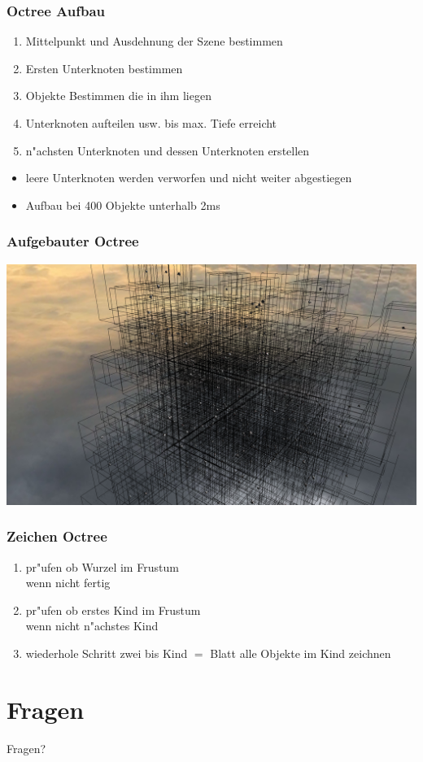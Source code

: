 \documentclass[notes]{beamer} %
\begin{document}
\begin{frame}
\begin{spacing}{1}
\frametitle{Octree Aufbau}
\begin{enumerate}
\item Mittelpunkt und Ausdehnung der Szene bestimmen
\item Ersten Unterknoten bestimmen 
\item Objekte Bestimmen die in ihm liegen
\item Unterknoten aufteilen usw. bis max. Tiefe erreicht
\item n"achsten Unterknoten und dessen Unterknoten erstellen
\end{enumerate}

\begin{itemize}
\item leere Unterknoten werden verworfen und nicht weiter abgestiegen
\item Aufbau bei 400 Objekte unterhalb 2ms
\end{itemize}
\end{spacing}
\end{frame}

\begin{frame}
\begin{spacing}{1}
\frametitle{Aufgebauter Octree}
\includegraphics[width = 1.0\textwidth]{oc2.png}
\end{spacing}
\end{frame}

\begin{frame}
\begin{spacing}{1}
\frametitle{Zeichen Octree}
\begin{enumerate}
\item pr"ufen ob Wurzel im Frustum\\wenn nicht fertig
\item pr"ufen ob erstes Kind im Frustum\\wenn nicht n"achstes Kind
\item wiederhole Schritt zwei bis Kind $=$ Blatt alle Objekte im Kind zeichnen
\end{enumerate}
\end{spacing}
\end{frame}

\section{Fragen}
\begin{frame}
\begin{center}
Fragen?
\end{center}
\end{frame}
\end{document}
